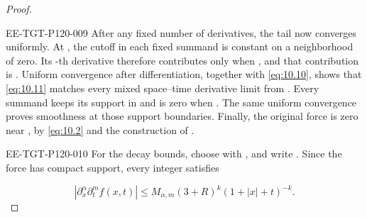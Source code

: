\begin{proof}
\begin{EESegment}{EE-TGT-P120-009}
After any fixed number of derivatives, the tail now converges uniformly. At
, the cutoff in each fixed summand is constant on a neighborhood of
zero. Its -th derivative therefore contributes only when
, and that contribution is . Uniform
convergence after differentiation, together with \eqref{eq:10.10}, shows that \eqref{eq:10.11}
matches every mixed space--time derivative limit from . Every summand
keeps its support in  and is zero when
. The same uniform convergence proves smoothness at those support
boundaries. Finally, the original force is zero near
, by \eqref{eq:10.2} and the construction of
.
\end{EESegment}

\begin{EESegment}{EE-TGT-P120-010}
For the decay bounds, choose  with
, and write
. Since the force
has compact support, every integer  satisfies
\end{EESegment}
\[
|\partial_x^\alpha\partial_t^mf(x,t)|
\leq M_{\alpha,m}(3+R)^k(1+|x|+t)^{-k}.
\]
\end{proof}
